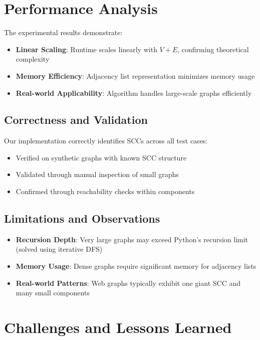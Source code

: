 \documentclass{book}
\theoremstyle{definition}
\begin{document}
\section{Performance Analysis}

The experimental results demonstrate:
\begin{itemize}
    \item \textbf{Linear Scaling}: Runtime scales linearly with $V + E$, confirming theoretical complexity
    \item \textbf{Memory Efficiency}: Adjacency list representation minimizes memory usage
    \item \textbf{Real-world Applicability}: Algorithm handles large-scale graphs efficiently
\end{itemize}

\subsection{Correctness and Validation}

Our implementation correctly identifies SCCs across all test cases:
\begin{itemize}
    \item Verified on synthetic graphs with known SCC structure
    \item Validated through manual inspection of small graphs
    \item Confirmed through reachability checks within components
\end{itemize}

\subsection{Limitations and Observations}

\begin{itemize}
    \item \textbf{Recursion Depth}: Very large graphs may exceed Python's recursion limit (solved using iterative DFS)
    \item \textbf{Memory Usage}: Dense graphs require significant memory for adjacency lists
    \item \textbf{Real-world Patterns}: Web graphs typically exhibit one giant SCC and many small components
\end{itemize}

\section{Challenges and Lessons Learned}
\end{document}
